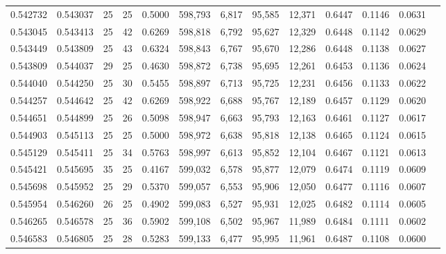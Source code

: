 \begin{tabular}{rrrrrrrrrrrrr}
0.542732 & 0.543037 &    25 &  25 &                                     0.5000 & 598,793 &   6,817 &  95,585 &  12,371 & 0.6447 & 0.1146 & 0.0631 \\
0.543045 & 0.543413 &    25 &  42 &                                     0.6269 & 598,818 &   6,792 &  95,627 &  12,329 & 0.6448 & 0.1142 & 0.0629 \\
0.543449 & 0.543809 &    25 &  43 &                                     0.6324 & 598,843 &   6,767 &  95,670 &  12,286 & 0.6448 & 0.1138 & 0.0627 \\
0.543809 & 0.544037 &    29 &  25 &                                     0.4630 & 598,872 &   6,738 &  95,695 &  12,261 & 0.6453 & 0.1136 & 0.0624 \\
0.544040 & 0.544250 &    25 &  30 &                                     0.5455 & 598,897 &   6,713 &  95,725 &  12,231 & 0.6456 & 0.1133 & 0.0622 \\
0.544257 & 0.544642 &    25 &  42 &                                     0.6269 & 598,922 &   6,688 &  95,767 &  12,189 & 0.6457 & 0.1129 & 0.0620 \\
0.544651 & 0.544899 &    25 &  26 &                                     0.5098 & 598,947 &   6,663 &  95,793 &  12,163 & 0.6461 & 0.1127 & 0.0617 \\
0.544903 & 0.545113 &    25 &  25 &                                     0.5000 & 598,972 &   6,638 &  95,818 &  12,138 & 0.6465 & 0.1124 & 0.0615 \\
0.545129 & 0.545411 &    25 &  34 &                                     0.5763 & 598,997 &   6,613 &  95,852 &  12,104 & 0.6467 & 0.1121 & 0.0613 \\
0.545421 & 0.545695 &    35 &  25 &                                     0.4167 & 599,032 &   6,578 &  95,877 &  12,079 & 0.6474 & 0.1119 & 0.0609 \\
0.545698 & 0.545952 &    25 &  29 &                                     0.5370 & 599,057 &   6,553 &  95,906 &  12,050 & 0.6477 & 0.1116 & 0.0607 \\
0.545954 & 0.546260 &    26 &  25 &                                     0.4902 & 599,083 &   6,527 &  95,931 &  12,025 & 0.6482 & 0.1114 & 0.0605 \\
0.546265 & 0.546578 &    25 &  36 &                                     0.5902 & 599,108 &   6,502 &  95,967 &  11,989 & 0.6484 & 0.1111 & 0.0602 \\
0.546583 & 0.546805 &    25 &  28 &                                     0.5283 & 599,133 &   6,477 &  95,995 &  11,961 & 0.6487 & 0.1108 & 0.0600 \\

\end{tabular}
